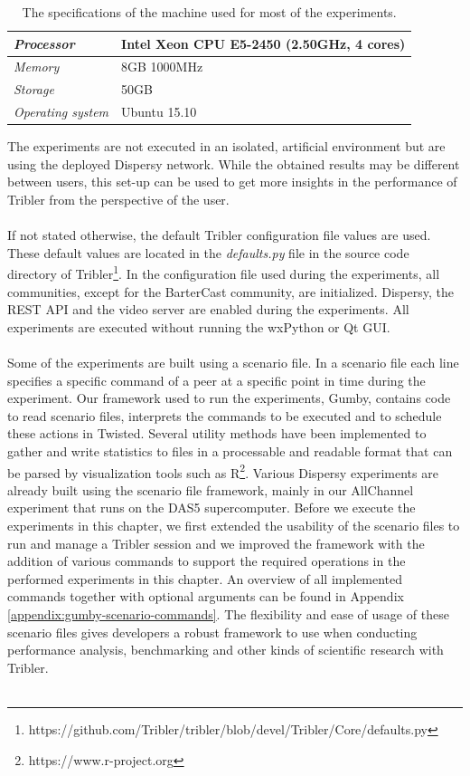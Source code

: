 \begin{table}[h!]
	\centering
	\begin{tabular}{|l|l|}
		\hline
		\emph{Processor} & Intel Xeon CPU E5-2450 (2.50GHz, 4 cores)\\ \hline
		\emph{Memory} & 8GB 1000MHz \\ \hline
		\emph{Storage} & 50GB \\ \hline
		\emph{Operating system} & Ubuntu 15.10 \\ \hline
	\end{tabular}
	\caption{The specifications of the machine used for most of the experiments.}
	\label{table:experiments-server-specifications}
\end{table}

The experiments are not executed in an isolated, artificial environment but are using the deployed Dispersy network. While the obtained results may be different between users, this set-up can be used to get more insights in the performance of Tribler from the perspective of the user.\\\\
If not stated otherwise, the default Tribler configuration file values are used. These default values are located in the \emph{defaults.py} file in the source code directory of Tribler\footnote{https://github.com/Tribler/tribler/blob/devel/Tribler/Core/defaults.py}. In the configuration file used during the experiments, all communities, except for the BarterCast community, are initialized. Dispersy, the REST API and the video server are enabled during the experiments. All experiments are executed without running the wxPython or Qt GUI.\\\\
Some of the experiments are built using a scenario file. In a scenario file each line specifies a specific command of a peer at a specific point in time during the experiment. Our framework used to run the experiments, Gumby, contains code to read scenario files, interprets the commands to be executed and to schedule these actions in Twisted. Several utility methods have been implemented to gather and write statistics to files in a processable and readable format that can be parsed by visualization tools such as R\footnote{https://www.r-project.org}. Various Dispersy experiments are already built using the scenario file framework, mainly in our AllChannel experiment that runs on the DAS5 supercomputer. Before we execute the experiments in this chapter, we first extended the usability of the scenario files to run and manage a Tribler session and we improved the framework with the addition of various commands to support the required operations in the performed experiments in this chapter. An overview of all implemented commands together with optional arguments can be found in Appendix \ref{appendix:gumby-scenario-commands}. The flexibility and ease of usage of these scenario files gives developers a robust framework to use when conducting performance analysis, benchmarking and other kinds of scientific research with Tribler.\\\\
